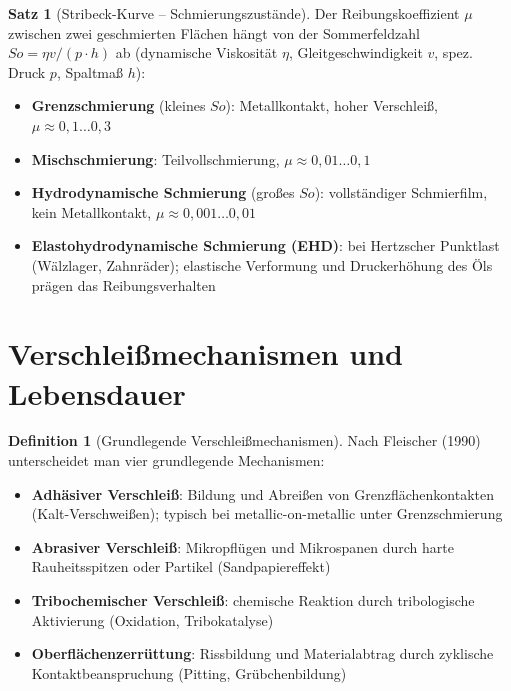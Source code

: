 ﻿\documentclass[a4paper,12pt]{report}
\theoremstyle{definition}
\newtheorem{definition}{Definition}
\newtheorem{satz}{Satz}
\begin{document}
\begin{satz}[Stribeck-Kurve -- Schmierungszustände]
Der Reibungskoeffizient $\mu$ zwischen zwei geschmierten Flächen
hängt von der Sommerfeldzahl $So = \eta v / (p \cdot h)$ ab
(dynamische Viskosität $\eta$, Gleitgeschwindigkeit $v$, spez. Druck $p$, Spaltmaß $h$):
\begin{itemize}
    \item[-] \textbf{Grenzschmierung} (kleines $So$): Metallkontakt, hoher Verschleiß,
          $\mu \approx 0{,}1\ldots0{,}3$
    \item[-] \textbf{Mischschmierung}: Teilvollschmierung, $\mu \approx 0{,}01\ldots0{,}1$
    \item[-] \textbf{Hydrodynamische Schmierung} (großes $So$): vollständiger Schmierfilm,
          kein Metallkontakt, $\mu \approx 0{,}001\ldots0{,}01$
    \item[-] \textbf{Elastohydrodynamische Schmierung (EHD)}: bei Hertzscher Punktlast
          (Wälzlager, Zahnräder); elastische Verformung und Druckerhöhung
          des Öls prägen das Reibungsverhalten
\end{itemize}
\end{satz}

\section{Verschleißmechanismen und Lebensdauer}

\begin{definition}[Grundlegende Verschleißmechanismen]
Nach Fleischer (1990) unterscheidet man vier grundlegende Mechanismen:
\begin{itemize}
    \item[-] \textbf{Adhäsiver Verschleiß}: Bildung und Abreißen von
          Grenzflächenkontakten (Kalt-Verschweißen); typisch bei
          metallic-on-metallic unter Grenzschmierung
    \item[-] \textbf{Abrasiver Verschleiß}: Mikropflügen und Mikrospanen
          durch harte Rauheitsspitzen oder Partikel (Sandpapiereffekt)
    \item[-] \textbf{Tribochemischer Verschleiß}: chemische Reaktion
          durch tribologische Aktivierung (Oxidation, Tribokatalyse)
    \item[-] \textbf{Oberflächenzerrüttung}: Rissbildung und Materialabtrag
          durch zyklische Kontaktbeanspruchung (Pitting, Grübchenbildung)
\end{itemize}
\end{definition}
\end{document}
